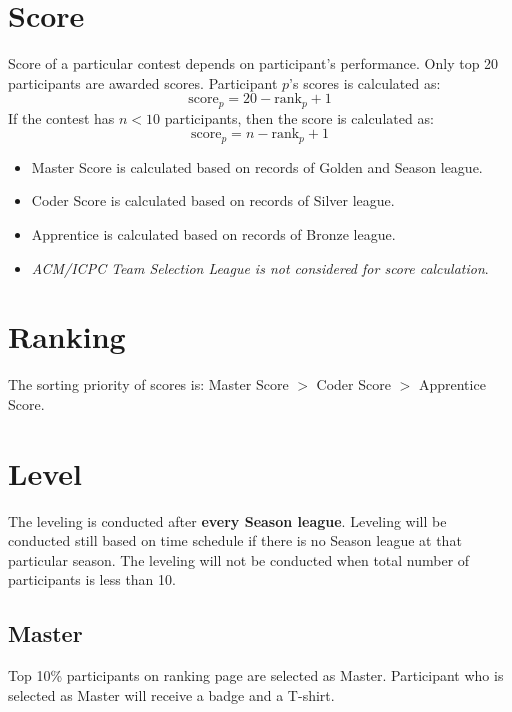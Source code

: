 \documentclass{article}
\begin{document}
\section{Score}

Score of a particular contest depends on participant's performance. Only top 20 participants are awarded scores. Participant $p$'s scores is calculated as:
\begin{equation*}
	\text{score}_{p}=20-\text{rank}_{p}+1
\end{equation*}
If the contest has $n<10$ participants, then the score is calculated as:
\begin{equation*}
	\text{score}_{p}=n-\text{rank}_{p}+1
\end{equation*}

\begin{itemize}
	\item Master Score is calculated based on records of Golden and Season league.
	\item Coder Score is calculated based on records of Silver league.
	\item Apprentice is calculated based on records of Bronze league.
	\item \emph{ACM/ICPC Team Selection League is not considered for score calculation}.
\end{itemize}

\section{Ranking}

The sorting priority of scores is: Master Score $>$ Coder Score $>$ Apprentice Score.

\section{Level}

The leveling is conducted after \textbf{every Season league}. Leveling will be conducted still based on time schedule if there is no Season league at that particular season. The leveling will not be conducted when total number of participants is less than 10.

\subsection{Master}

Top 10\% participants on ranking page are selected as Master. Participant who is selected as Master will receive a badge and a T-shirt.
\end{document}
